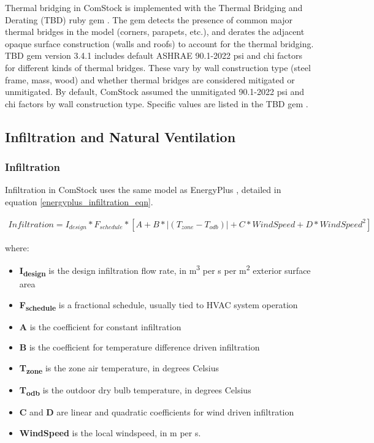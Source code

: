 Thermal bridging in ComStock is implemented with the Thermal Bridging and Derating (TBD) ruby gem \citep{tbd_gem}. The gem detects the presence of common major thermal bridges in the model (corners, parapets, etc.), and derates the adjacent opaque surface construction (walls and roofs) to account for the thermal bridging. TBD gem version 3.4.1 includes default ASHRAE 90.1-2022 psi and chi factors for different kinds of thermal bridges. These vary by wall construction type (steel frame, mass, wood) and whether thermal bridges are considered mitigated or unmitigated. By default, ComStock assumed the unmitigated 90.1-2022 psi and chi factors by wall construction type. Specific values are listed in the TBD gem \citep{tbd_gem}.

\subsection{Infiltration and Natural Ventilation} %

\subsubsection{Infiltration}
Infiltration in ComStock uses the same model as EnergyPlus \citep{energy_plus}, detailed in equation \ref{energyplus_infiltration_eqn}.

\begin{align}
\label{energyplus_infiltration_eqn}
Infiltration = I_{design} * F_{schedule} * [A + B * |(T_{zone} - T_{odb})| + C * WindSpeed + D * WindSpeed^2]
\end{align}

where:\\
\begin{itemize}
\item \textbf{I\textsubscript{design}} is the design infiltration flow rate, in m\textsuperscript{3} per s per m\textsuperscript{2} exterior surface area\\
\item \textbf{F\textsubscript{schedule}} is a fractional schedule, usually tied to HVAC system operation\\
\item \textbf{A} is the coefficient for constant infiltration\\
\item \textbf{B} is the coefficient for temperature difference driven infiltration\\
\item \textbf{T\textsubscript{zone}} is the zone air temperature, in degrees Celsius\\
\item \textbf{T\textsubscript{odb}}  is the outdoor dry bulb temperature, in degrees Celsius\\
\item \textbf{C} and \textbf{D} are linear and quadratic coefficients for wind driven infiltration\\
\item \textbf{WindSpeed} is the local windspeed, in m per s.\\
\end{itemize}

